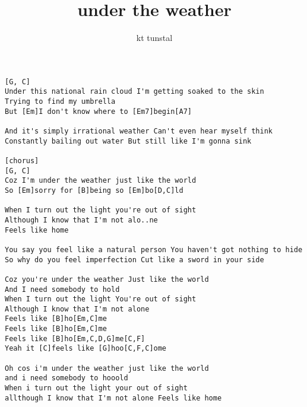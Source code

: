 \author{kt tunstal}
\title{under the weather}
\maketitle
\begin{verbatim}
[G, C]
Under this national rain cloud I'm getting soaked to the skin
Trying to find my umbrella
But [Em]I don't know where to [Em7]begin[A7]

And it's simply irrational weather Can't even hear myself think
Constantly bailing out water But still like I'm gonna sink

[chorus]
[G, C]
Coz I'm under the weather just like the world
So [Em]sorry for [B]being so [Em]bo[D,C]ld

When I turn out the light you're out of sight
Although I know that I'm not alo..ne
Feels like home

You say you feel like a natural person You haven't got nothing to hide
So why do you feel imperfection Cut like a sword in your side

Coz you're under the weather Just like the world
And I need somebody to hold 
When I turn out the light You're out of sight
Although I know that I'm not alone
Feels like [B]ho[Em,C]me   
Feels like [B]ho[Em,C]me   
Feels like [B]ho[Em,C,D,G]me[C,F]
Yeah it [C]feels like [G]hoo[C,F,C]ome

Oh cos i'm under the weather just like the world
and i need somebody to hooold
When i turn out the light your out of sight
allthough I know that I'm not alone Feels like home
\end{verbatim}